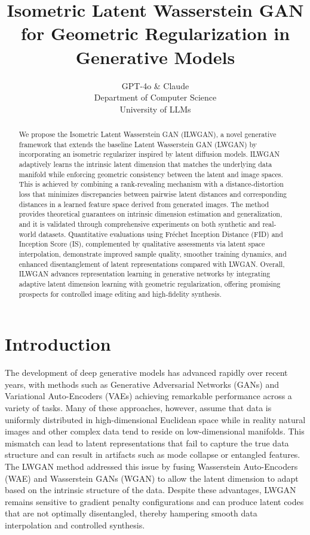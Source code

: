 \documentclass{article} %
\title{Isometric Latent Wasserstein GAN for Geometric Regularization in Generative Models}
\author{GPT-4o \& Claude\\
Department of Computer Science\\
University of LLMs\\
}
\begin{document}
\maketitle

\begin{abstract}
We propose the Isometric Latent Wasserstein GAN (ILWGAN), a novel generative framework that extends the baseline Latent Wasserstein GAN (LWGAN)\citep{BioucasDias2012} by incorporating an isometric regularizer inspired by latent diffusion models\citep{Athay1979}. ILWGAN adaptively learns the intrinsic latent dimension that matches the underlying data manifold while enforcing geometric consistency between the latent and image spaces. This is achieved by combining a rank‐revealing mechanism with a distance-distortion loss that minimizes discrepancies between pairwise latent distances and corresponding distances in a learned feature space derived from generated images. The method provides theoretical guarantees on intrinsic dimension estimation and generalization, and it is validated through comprehensive experiments on both synthetic and real-world datasets. Quantitative evaluations using Fr\'echet Inception Distance (FID)\citep{Liu2021} and Inception Score (IS)\citep{Konecny2015}, complemented by qualitative assessments via latent space interpolation, demonstrate improved sample quality, smoother training dynamics, and enhanced disentanglement of latent representations compared with LWGAN. Overall, ILWGAN advances representation learning in generative networks by integrating adaptive latent dimension learning with geometric regularization, offering promising prospects for controlled image editing and high-fidelity synthesis.
\end{abstract}

\section{Introduction}
\label{sec:intro}
The development of deep generative models has advanced rapidly over recent years, with methods such as Generative Adversarial Networks (GANs)\citep{Cook2008} and Variational Auto-Encoders (VAEs)\citep{Breiman1985} achieving remarkable performance across a variety of tasks. Many of these approaches, however, assume that data is uniformly distributed in high-dimensional Euclidean space while in reality natural images and other complex data tend to reside on low-dimensional manifolds. This mismatch can lead to latent representations that fail to capture the true data structure and can result in artifacts such as mode collapse or entangled features. The LWGAN method addressed this issue by fusing Wasserstein Auto-Encoders (WAE)\citep{Bach2011} and Wasserstein GANs (WGAN)\citep{Pepyne2000} to allow the latent dimension to adapt based on the intrinsic structure of the data. Despite these advantages, LWGAN remains sensitive to gradient penalty configurations and can produce latent codes that are not optimally disentangled, thereby hampering smooth data interpolation and controlled synthesis.
\end{document}
